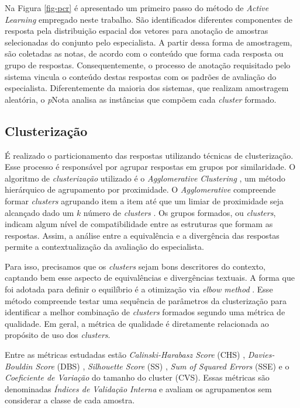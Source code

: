 Na Figura \ref{fig-pcr} é apresentado um primeiro passo do método de \textit{Active Learning} empregado neste trabalho. São identificados diferentes componentes de resposta pela distribuição espacial dos vetores para anotação de amostras selecionadas do conjunto pelo especialista. A partir dessa forma de amostragem, são coletadas as notas, de acordo com o conteúdo que forma cada resposta ou grupo de respostas. Consequentemente, o processo de anotação requisitado pelo sistema vincula o conteúdo destas respostas com os padrões de avaliação do especialista. Diferentemente da maioria dos sistemas, que realizam amostragem aleatória, o \textit{p}Nota analisa as instâncias que compõem cada \textit{cluster} formado.


\subsection{Clusterização}
\label{subsec-clusterizacao}

É realizado o particionamento das respostas utilizando técnicas de clusterização. Esse processo é responsável por agrupar respostas em grupos por similaridade. O algoritmo de \textit{clusterização} utilizado é o \textit{Agglomerative Clustering} \cite{spalenza2019}, um método hierárquico de agrupamento por proximidade. O \textit{Agglomerative} compreende formar \textit{clusters} agrupando item a item até que um limiar de proximidade seja alcançado dado um $ k $ número de \textit{clusters} \cite{everitt2011}. Os grupos formados, ou \textit{clusters}, indicam algum nível de compatibilidade entre as estruturas que formam as respostas. Assim, a análise entre a equivalência e a divergência das respostas permite a contextualização da avaliação do especialista.

Para isso, precisamos que os \textit{clusters} sejam bons descritores do contexto, captando bem esse aspecto de equivalências e divergências textuais. A forma que foi adotada para definir o equilíbrio é a otimização via \textit{elbow method} \cite{everitt2011}. Esse método compreende testar uma sequência de parâmetros da clusterização para identificar a melhor combinação de \textit{clusters} formados segundo uma métrica de qualidade. Em geral, a métrica de qualidade é diretamente relacionada ao propósito de uso dos \textit{clusters}.

Entre as métricas estudadas estão \textit{Calinski-Harabasz Score} (CHS) \cite{calinskiharabasz1974}, \textit{Davies-Bouldin Score} (DBS) \cite{daviesbouldin1979}, \textit{Silhouette Score} (SS) \cite{rousseeuw1987}, \textit{Sum of Squared Errors} (SSE) \cite{maimon2005} e o \textit{Coeficiente de Variação} do tamanho do cluster (CVS). Essas métricas são denominadas \textit{Índices de Validação Interna} e avaliam os agrupamentos sem considerar a classe de cada amostra.

